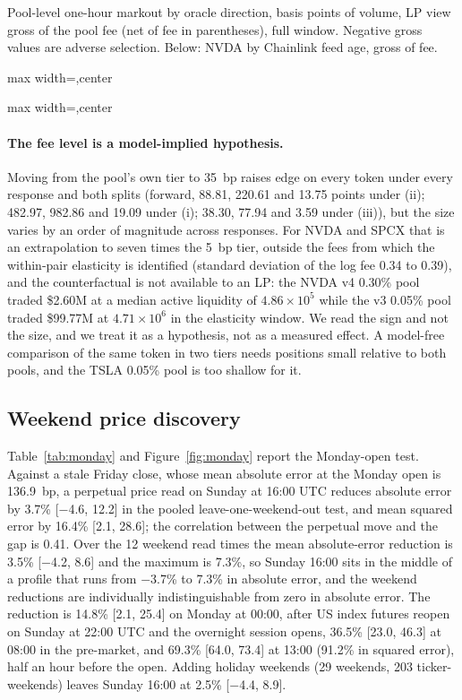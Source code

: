 \documentclass[11pt]{article}
\newcommand{\USD}{\$}
\newcommand{\tabfit}[1]{\begin{adjustbox}{max width=\linewidth,center}\small\end{adjustbox}}
\begin{document}
\begin{table}[!tbp]
\centering
\caption{Pool-level one-hour markout by oracle direction, basis points of volume, LP view gross of the pool fee (net of fee in parentheses), full window. Negative gross values are adverse selection. Below: NVDA by Chainlink feed age, gross of fee.}
\label{tab:direction}
\label{tab:age}
\tabfit{t_direction.tex}

\vspace{6pt}
\tabfit{t_age.tex}
\end{table}

\paragraph{The fee level is a model-implied hypothesis.} Moving from the pool's own tier to 35~bp raises edge on every token under every response and both splits (forward, 88.81, 220.61 and 13.75 points under (ii); 482.97, 982.86 and 19.09 under (i); 38.30, 77.94 and 3.59 under (iii)), but the size varies by an order of magnitude across responses. For NVDA and SPCX that is an extrapolation to seven times the 5~bp tier, outside the fees from which the within-pair elasticity is identified (standard deviation of the log fee 0.34 to 0.39), and the counterfactual is not available to an LP: the NVDA v4 0.30\% pool traded \USD2.60M at a median active liquidity of $4.86\times10^5$ while the v3 0.05\% pool traded \USD99.77M at $4.71\times10^6$ in the elasticity window. We read the sign and not the size, and we treat it as a hypothesis, not as a measured effect. A model-free comparison of the same token in two tiers needs positions small relative to both pools, and the TSLA 0.05\% pool is too shallow for it.

\subsection{Weekend price discovery}\label{sec:res:monday}

Table~\ref{tab:monday} and Figure~\ref{fig:monday} report the Monday-open test. Against a stale Friday close, whose mean absolute error at the Monday open is 136.9~bp, a perpetual price read on Sunday at 16:00 UTC reduces absolute error by 3.7\% [$-$4.6, 12.2] in the pooled leave-one-weekend-out test, and mean squared error by 16.4\% [2.1, 28.6]; the correlation between the perpetual move and the gap is 0.41. Over the 12 weekend read times the mean absolute-error reduction is 3.5\% [$-$4.2, 8.6] and the maximum is 7.3\%, so Sunday 16:00 sits in the middle of a profile that runs from $-$3.7\% to 7.3\% in absolute error, and the weekend reductions are individually indistinguishable from zero in absolute error. The reduction is 14.8\% [2.1, 25.4] on Monday at 00:00, after US index futures reopen on Sunday at 22:00 UTC and the overnight session opens, 36.5\% [23.0, 46.3] at 08:00 in the pre-market, and 69.3\% [64.0, 73.4] at 13:00 (91.2\% in squared error), half an hour before the open. Adding holiday weekends (29 weekends, 203 ticker-weekends) leaves Sunday 16:00 at 2.5\% [$-$4.4, 8.9].
\end{document}
